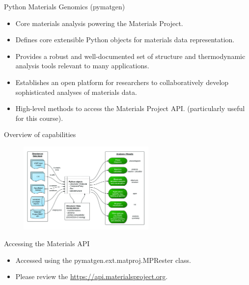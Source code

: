 \documentclass[aspectratio=169]{beamer}
\begin{document}
\begin{frame}{Python Materials Genomics (pymatgen)}
        \begin{itemize}
            \item Core materials analysis powering the Materials Project.\cite{ongPythonMaterialsGenomics2013}
            \item Defines core extensible Python objects for materials data representation.
            \item Provides a robust and well-documented set of structure and thermodynamic analysis tools relevant to many applications.
            \item Establishes an open platform for researchers to collaboratively develop sophisticated analyses of materials data.
            \item High-level methods to access the Materials Project API.\cite{ongMaterialsApplicationProgramming2015} (particularly useful for this course).
        \end{itemize}
    \end{frame}


    \begin{frame}{Overview of capabilities}
        \begin{figure}
            \centering
            \includegraphics[width=0.6\textwidth]{figures/pymatgen-overview.jpg}
        \end{figure}
    \end{frame}


    \begin{frame}[fragile]{Accessing the Materials API}
        \begin{itemize}
            \item Accessed using the pymatgen.ext.matproj.MPRester class.
            \item Please review the \href{Materials API documentation}{https://api.materialsproject.org}.
            \inputminted{python}{code/example_materials_api.py}
        \end{itemize}
    \end{frame}
\end{document}
